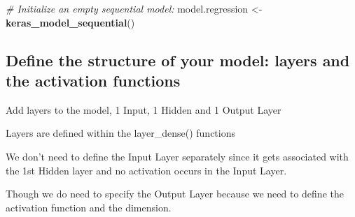 \documentclass[
]{book}
\newenvironment{Shaded}{\begin{snugshade}}{\end{snugshade}}
\newcommand{\CommentTok}[1]{\textcolor[rgb]{0.56,0.35,0.01}{\textit{#1}}}
\newcommand{\DataTypeTok}[1]{\textcolor[rgb]{0.13,0.29,0.53}{#1}}
\newcommand{\DecValTok}[1]{\textcolor[rgb]{0.00,0.00,0.81}{#1}}
\newcommand{\KeywordTok}[1]{\textcolor[rgb]{0.13,0.29,0.53}{\textbf{#1}}}
\newcommand{\NormalTok}[1]{#1}
\newcommand{\OperatorTok}[1]{\textcolor[rgb]{0.81,0.36,0.00}{\textbf{#1}}}
\newcommand{\StringTok}[1]{\textcolor[rgb]{0.31,0.60,0.02}{#1}}
\begin{document}
\begin{Shaded}
\begin{Highlighting}[]
\CommentTok{# Initialize an empty sequential model:}
\NormalTok{model.regression <-}\StringTok{ }\KeywordTok{keras_model_sequential}\NormalTok{()}
\end{Highlighting}
\end{Shaded}

\hypertarget{define-the-structure-of-your-model-layers-and-the-activation-functions}{%
\subsection{Define the structure of your model: layers and the activation functions}\label{define-the-structure-of-your-model-layers-and-the-activation-functions}}

Add layers to the model, 1 Input, 1 Hidden and 1 Output Layer

Layers are defined within the layer\_dense() functions

We don't need to define the Input Layer separately since it gets associated with the 1st Hidden layer and no activation occurs in the Input Layer.

Though we do need to specify the Output Layer because we need to define the activation function and the dimension.

\begin{Shaded}
\end{Shaded}
\end{document}
